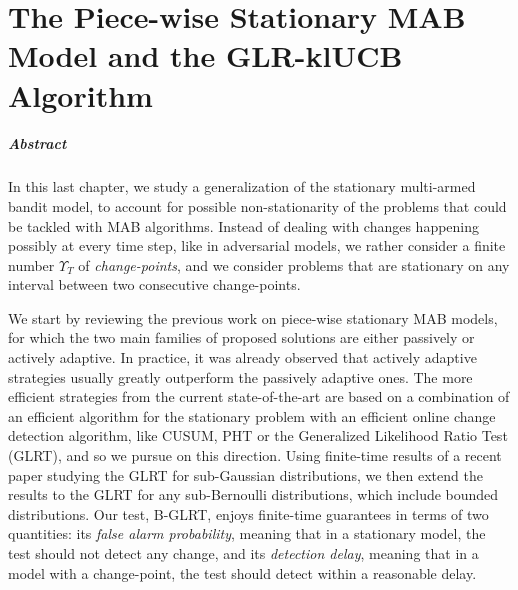 

\chapter{The Piece-wise Stationary MAB Model and the GLR-klUCB Algorithm}
\label{chapter:6}
\minitoc

\paragraph{Abstract}

In this last chapter, we study a generalization of the stationary multi-armed bandit model,
to account for possible non-stationarity of the problems that could be tackled with MAB algorithms.
Instead of dealing with changes happening possibly at every time step, like in adversarial models, we rather consider a finite number $\Upsilon_T$ of \emph{change-points}, and we consider problems that are stationary on any interval between two consecutive change-points.

We start by reviewing the previous work on piece-wise stationary MAB models, for which the two main families of proposed solutions are either passively or actively adaptive. In practice, it was already observed that actively adaptive strategies usually greatly outperform the passively adaptive ones.
The more efficient strategies from the current state-of-the-art are based on a combination of an efficient algorithm for the stationary problem with an efficient online change detection algorithm, like CUSUM, PHT or the Generalized Likelihood Ratio Test (GLRT), and so we pursue on this direction.
%
Using finite-time results of a recent paper studying the GLRT for sub-Gaussian distributions, we then extend the results to the GLRT for any sub-Bernoulli distributions, which include bounded distributions. Our test, B-GLRT, enjoys finite-time guarantees in terms of two quantities:
its \emph{false alarm probability}, meaning that in a stationary model, the test should not detect any change,
and its \emph{detection delay}, meaning that in a model with a change-point, the test should detect within a reasonable delay.

